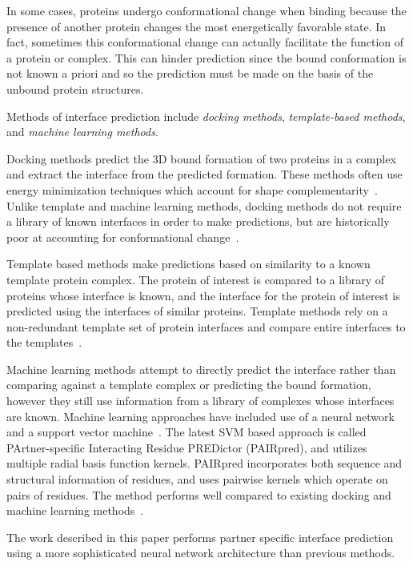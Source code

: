 In some cases, proteins undergo conformational change when binding because the presence of another protein changes the most energetically favorable state. 
In fact, sometimes this conformational change can actually facilitate the function of a protein or complex.
This can hinder prediction since the bound conformation is not known a priori and so the prediction must be made on the basis of the unbound protein structures. 

Methods of interface prediction include \textit{docking methods}, \textit{template-based methods}, and \textit{machine learning methods}.

Docking methods predict the 3D bound formation of two proteins in a complex and extract the interface from the predicted formation. 
These methods often use energy minimization techniques which account for shape complementarity~\cite{chen2003}\cite{zundert2016}.
Unlike template and machine learning methods, docking methods do not require a library of known interfaces in order to make predictions, but are historically poor at accounting for conformational change~\cite{ezkurdia2009}.

Template based methods make predictions based on similarity to a known template protein complex.
The protein of interest is compared to a library of proteins whose interface is known, and the interface for the protein of interest is predicted using the interfaces of similar proteins.
Template methods rely on a non-redundant template set of protein interfaces and compare entire interfaces to the templates~\cite{tuncbag2011}.

Machine learning methods attempt to directly predict the interface rather than comparing against a template complex or predicting the bound formation, however they still use information from a library of complexes whose interfaces are known.
Machine learning approaches have included use of a neural network~\cite{ahmad2011} and a support vector machine~\cite{minhas2014}.
The latest SVM based approach is called PArtner-specific Interacting Residue PREDictor (PAIRpred), and utilizes multiple radial basis function kernels.
PAIRpred incorporates both sequence and structural information of residues, and uses pairwise kernels which operate on pairs of residues.
The method performs well compared to existing docking and machine learning methods~\cite{minhas2014}.



The work described in this paper performs partner specific interface prediction using a more sophisticated neural network architecture than previous methods. 


